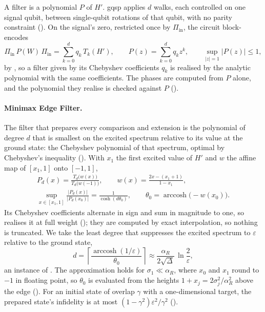 A filter is a polynomial $P$ of $H'$. \Gls{gqsp} \cite{motlagh2024gqsp} applies $d$ walks, each controlled on one signal qubit, between single-qubit rotations of that qubit, with no parity constraint (). On the signal's zero, restricted once by $\Pi_{\mathrm{in}}$, the circuit block-encodes
\begin{equation}
    \Pi_{\mathrm{in}}\,P(W)\,\Pi_{\mathrm{in}}=\sum_{k=0}^{d}q_k\,T_k(H'),
    \qquad
    P(z)=\sum_{k=0}^{d}q_kz^k,
    \qquad
    \sup_{|z|=1}|P(z)|\le1,
    \label{eq:gqsp-block}
\end{equation}
by , so a filter given by its Chebyshev coefficients $q_k$ is realised by the analytic polynomial with the same coefficients. The phases are computed from $P$ alone, and the polynomial they realise is checked against $P$ ().

\paragraph{Minimax Edge Filter.} The filter that prepares every comparison and extension is the polynomial of degree $d$ that is smallest on the excited spectrum relative to its value at the ground state: the Chebyshev polynomial of that spectrum, optimal by Chebyshev's inequality (). With $x_1$ the first excited value of $H'$ and $w$ the affine map of $[x_1,1]$ onto $[-1,1]$,
\begin{equation}
    \begin{gathered}
        P_d(x)=\frac{T_d\bigl(w(x)\bigr)}{T_d\bigl(w(-1)\bigr)},
        \qquad
        w(x)=\frac{2x-(x_1+1)}{1-x_1},
        \\
        \sup_{x\in[x_1,1]}\frac{|P_d(x)|}{|P_d(x_0)|}=\frac{1}{\cosh(d\theta_0)},
        \qquad
        \theta_0=\operatorname{arccosh}\bigl(-w(x_0)\bigr).
    \end{gathered}
    \label{eq:minimax-filter}
\end{equation}
Its Chebyshev coefficients alternate in sign and sum in magnitude to one, so  realises it at full weight (); they are computed by exact interpolation, so nothing is truncated. We take the least degree that suppresses the excited spectrum to $\varepsilon$ relative to the ground state,
\begin{equation}
    d=\left\lceil\frac{\operatorname{arccosh}(1/\varepsilon)}{\theta_0}\right\rceil
    \approx\frac{\alpha_R}{2\sqrt\Delta}\,\ln\frac{2}{\varepsilon},
    \label{eq:minimax-degree}
\end{equation}
an instance of . The approximation holds for $\sigma_1\ll\alpha_R$, where $x_0$ and $x_1$ round to $-1$ in floating point, so $\theta_0$ is evaluated from the heights $1+x_j=2\sigma_j^2/\alpha_R^2$ above the edge (). For an initial state of overlap $\gamma$ with a one-dimensional target, the prepared state's infidelity is at most $(1-\gamma^2)\varepsilon^2/\gamma^2$ ().

